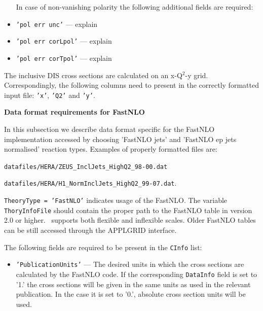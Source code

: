 \begin{description}
\begin{itemize}
    In case of non-vanishing polarity the following additional fields are required:

    \item {\tt 'pol err unc'} --- explain

    \item {\tt 'pol err corLpol'} --- explain
 
    \item {\tt 'pol err corTpol'} --- explain

\end{itemize}

The inclusive DIS cross sections are calculated on an x-Q$^2$-y grid. Correspondingly,
the following columns need to present in the correctly formatted input file: 
{\tt 'x'}, {\tt 'Q2'} and {\tt 'y'}.



\item \bf{Data format requirements for FastNLO} \rm

In this subsection we describe data format specific for the FastNLO implementation
accessed by choosing 'FastNLO jets' and 'FastNLO ep jets normalised' reaction types.
Examples of properly formatted files are:

   {\tt datafiles/HERA/ZEUS\_InclJets\_HighQ2\_98-00.dat}

   {\tt datafiles/HERA/H1\_NormInclJets\_HighQ2\_99-07.dat}.

{\tt TheoryType = 'FastNLO'} indicates usage of the FastNLO. The variable {\tt ThoryInfoFile} 
should contain the proper path to the FastNLO table in version 2.0 or higher.
\fitter\ supports both flexible and inflexible scales.
Older FastNLO tables can be still accessed through the APPLGRID interface.

The following fields are required to be present in the {\tt CInfo} list:

\begin{itemize}

    \item {\tt 'PublicationUnits'} --- The desired units in which the cross sections 
    are calculated by the FastNLO code. If the corresponding {\tt DataInfo} field is 
    set to '1.' the cross sections will be given in the same units as used in the
    relevant publication. In the case it is set to '0.', absolute cross section
    units will be used. 


\end{itemize}
\end{description}

